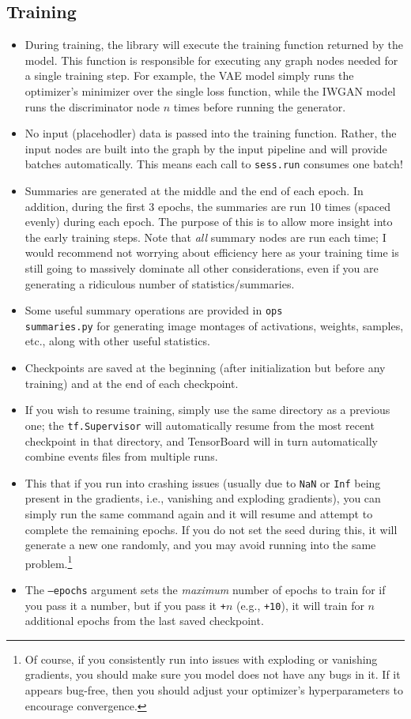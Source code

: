 \documentclass{article}
\begin{document}
\begin{flushleft}
  \section{Training}
  \begin{itemize}
  \item During training, the library will execute the training function returned by the model. This function is responsible for executing any graph nodes needed for a single training step. For example, the VAE model simply runs the optimizer's minimizer over the single loss function, while the IWGAN model runs the discriminator node $n$ times before running the generator. 
  \item No input (placehodler) data is passed into the training function. Rather, the input nodes are built into the graph by the input pipeline and will provide batches automatically. This means each call to \texttt{sess.run} consumes one batch!
  \item Summaries are generated at the middle and the end of each epoch. In addition, during the first 3 epochs, the summaries are run 10 times (spaced evenly) during each epoch. The purpose of this is to allow more insight into the early training steps. Note that \emph{all} summary nodes are run each time; I would recommend not worrying about efficiency here as your training time is still going to massively dominate all other considerations, even if you are generating a ridiculous number of statistics/summaries.
  \item Some useful summary operations are provided in \texttt{ops\\summaries.py} for generating image montages of activations, weights, samples, etc., along with other useful statistics. 
  \item Checkpoints are saved at the beginning (after initialization but before any training) and at the end of each checkpoint. 
  \item If you wish to resume training, simply use the same directory as a previous one; the \texttt{tf.Supervisor} will automatically resume from the most recent checkpoint in that directory, and TensorBoard will in turn automatically combine events files from multiple runs.
  \item This that if you run into crashing issues (usually due to \texttt{NaN} or \texttt{Inf} being present in the gradients, i.e., vanishing and exploding gradients), you can simply run the same command again and it will resume and attempt to complete the remaining epochs. If you do not set the seed during this, it will generate a new one randomly, and you may avoid running into the same problem.\footnote{Of course, if you consistently run into issues with exploding or vanishing gradients, you should make sure you model does not have any bugs in it. If it appears bug-free, then you should adjust your optimizer's hyperparameters to encourage convergence.}
  \item The \texttt{--epochs} argument sets the \emph{maximum} number of epochs to train for if you pass it a number, but if you pass it \texttt{+$n$} (e.g., \texttt{+10}), it will train for $n$ additional epochs from the last saved checkpoint. 
  \end{itemize}
  

\end{flushleft}
\end{document}
